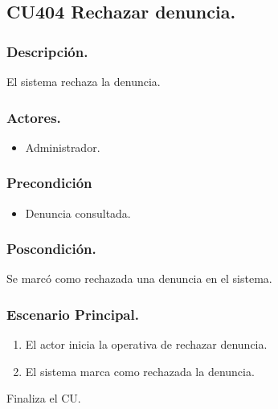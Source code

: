 \subsection{CU404 Rechazar denuncia.}
\subsubsection{Descripci\'{o}n.}
El sistema rechaza la denuncia.
\subsubsection{Actores.}
\begin{itemize}
\item Administrador.
\end{itemize}
\subsubsection{Precondici\'{o}n}
\begin{itemize}
\item Denuncia consultada.
\end{itemize}
\subsubsection{Poscondici\'{o}n.}
Se marc\'{o} como rechazada una denuncia en el sistema.
\subsubsection{Escenario Principal.}
\begin{enumerate}
\item El actor inicia la operativa de rechazar denuncia.
\item El sistema marca como rechazada la denuncia.
\end{enumerate}
Finaliza el CU.
